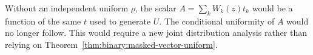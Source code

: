 \begin{remark}
Without an independent uniform $\rho$, the scalar
$A=\sum_kW_k(z)t_k$ would be a function of the same $t$
used to generate $U$. The conditional uniformity of $A$
would no longer follow. This would require a new joint
distribution analysis rather than relying on
Theorem~\ref{thm:binary:masked-vector-uniform}.
\end{remark}

